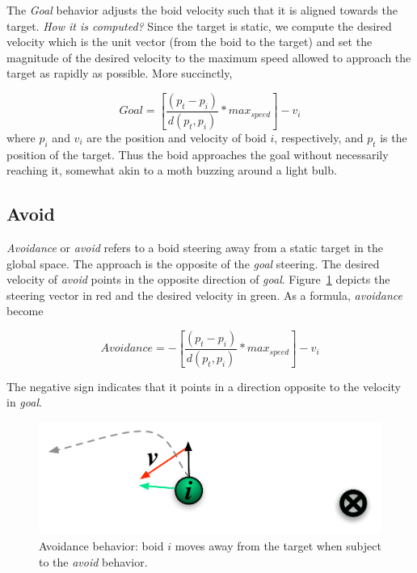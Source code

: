 The \textit{Goal} behavior adjusts the boid velocity such that it is aligned towards the target. \textit{How it is computed?} Since the target is static, we compute the desired velocity which is the unit vector (from the boid to the target) and set the magnitude of the desired velocity to the maximum speed allowed to approach the target as rapidly as possible. 
More succinctly, 

\begin{equation}
\label{goalEquation}
Goal = \left[\frac{(p_t - p_i)}{d(p_t,p_i)} * max_{speed} \right] - v_i
\end{equation}
where $p_i$ and $v_i$ are the position and velocity of boid $i$, respectively, and $p_t$ is the position of the target. Thus the boid approaches the goal without necessarily reaching it, somewhat akin to a moth buzzing around a light bulb.

\subsection{Avoid}
\textit{Avoidance} or \textit{avoid} refers to a boid steering away from a static target in the global space. The approach is the opposite of the \textit{goal} steering. The desired velocity of \textit{avoid} points in the opposite direction of \textit{goal}. Figure~\ref{avoidPDF} depicts the steering vector in red and the desired velocity in green. As a formula, 
\textit{avoidance} become

\begin{equation}
\label{avoidEquation}
Avoidance = -\left[\frac{(p_t - p_i)}{d(p_t,p_i)} * max_{speed} \right] - v_i
\end{equation}

The negative sign indicates that it points in a direction opposite to the velocity in \textit{goal}.

\begin{figure}[htbp]
\begin{center}
\includegraphics[scale=0.75]{figures/avoidance.pdf}
\caption{Avoidance behavior: boid $i$ moves away from the target when subject to the \textit{avoid} behavior.}
\label{avoidPDF}
\end{center}
\end{figure}

